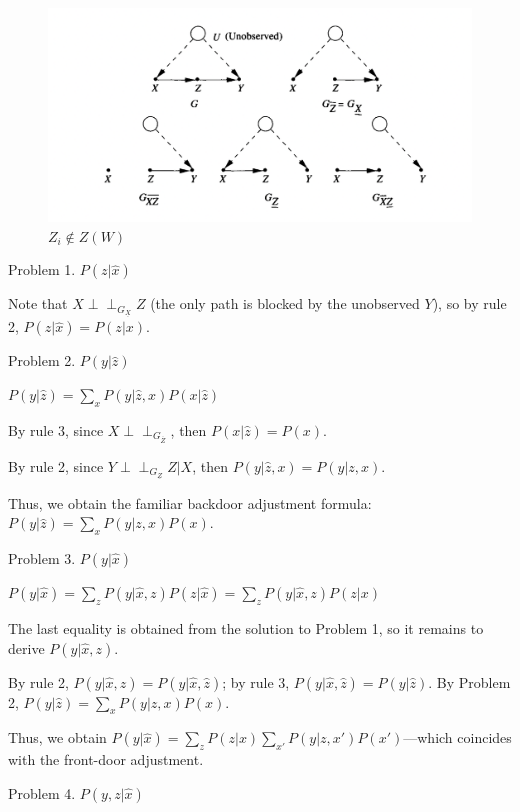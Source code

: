 \documentclass[fleqn]{article}
\newcommand{\independent}{\perp \!\!\! \perp}
\numberwithin{equation}{section}
\numberwithin{theorem}{section}
\numberwithin{figure}{section}
\numberwithin{lemma}{section}
\numberwithin{corollary}{section}
\begin{document}
\begin{figure}[h]
	\begin{center}
		\includegraphics[scale=0.6]{imgs/img23.png}
	\end{center}
	\caption{$Z_i \notin Z(W)$}
	\label{fig:rules_structure}
\end{figure}

Problem 1. $P(z|\hat x)$ 

Note that $X \independent_{G_{\underline{X}}} Z$ (the only path is blocked by the unobserved $Y$), so by rule 2, $P(z|\hat x) = P(z| x)$.

Problem 2. $P(y|\hat z)$

$P(y|\hat z) = \sum\limits_{x}P(y|\hat z, x)P(x|\hat z)$

By rule 3, since $X \independent_{G_{\overline Z}}$, then $P(x|\hat z) = P(x)$.

By rule 2, since $Y \independent_{G_{\underline Z}} Z | X$, then $P(y|\hat z, x) = P(y| z, x)$.

Thus, we obtain the familiar backdoor adjustment formula: $P(y|\hat z) = \sum\limits_{x}P(y|z, x)P(x)$.

Problem 3. $P(y|\hat x)$

$P(y|\hat x) = \sum\limits_{z}P(y|\hat x, z)P(z|\hat x) = \sum\limits_{z}P(y|\hat x, z)P(z|x)$

The last equality is obtained from the solution to Problem 1, so it remains to derive $P(y|\hat x, z)$.

By rule 2, $P(y|\hat x, z) = P(y|\hat x, \hat z)$; by rule 3, $P(y|\hat x, \hat z) = P(y|\hat z)$. By Problem 2, $P(y|\hat z) = \sum\limits_{x}P(y|z, x)P(x)$.

Thus, we obtain $P(y|\hat x) = \sum\limits_{z}P(z|x)\sum\limits_{x'}P(y|z,x')P(x')$—which coincides with the front-door adjustment.

Problem 4. $P(y, z|\hat x)$
\end{document}
